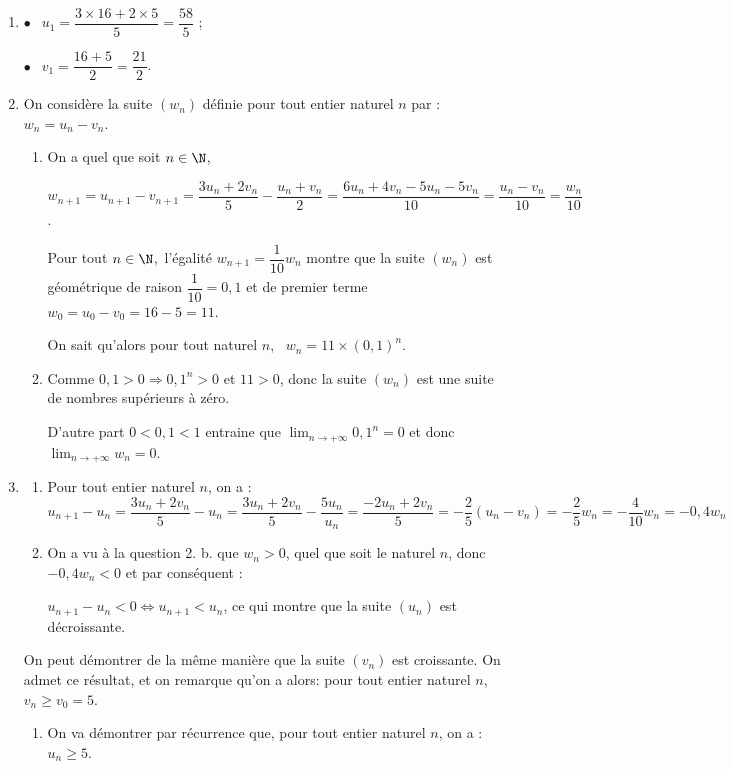 \begin{enumerate}
\item 

$\bullet~~$ $u_1 = \dfrac{3\times 16 + 2 \times 5}{5} = \dfrac{58}{5}$ ;

$\bullet~~$ $v_1 = \dfrac{16 +5}{2} = \dfrac{21}{2}$.

\item On considère la suite $\left(w_n\right)$ définie pour tout entier naturel $n$ par : $w_n = u_n - v_n$.
	\begin{enumerate}
		\item 
		On a quel que soit $n \in \N$, 
		
		$w_{n+1} = u_{n+1} - v_{n+1} = \dfrac{3u_n + 2v_n}{5} - \dfrac{u_n + v_n}{2} = \dfrac{6u_n + 4v_n - 5u_n - 5v_n}{10} = \dfrac{u_n - v_n}{10} = \dfrac{w_n}{10}$.
		
Pour tout $n \in \N$,\, l'égalité $w_{n+1} = \dfrac{1}{10}w_n$ montre que la suite $\left(w_n\right)$ est géométrique de raison $\dfrac{1}{10} = 0,1$ et de premier terme $w_0 = u_0 - v_0 = 16 - 5 = 11$.
		

On sait qu'alors pour tout naturel $n$, \, $w_n = 11 \times (0,1)^n$.
		\item 
		Comme $0,1 > 0 \Rightarrow 0,1^n > 0$ et $11 > 0$, donc la suite $\left(w_n\right)$ est une suite de nombres supérieurs à zéro.
		
		D'autre part $0 < 0,1 < 1$ entraine que $\displaystyle\lim_{n \to + \infty} 0,1^n = 0$ et donc $\displaystyle\lim_{n \to + \infty} w_n = 0$.
	\end{enumerate}
\item 
	\begin{enumerate}
		\item 
		Pour tout entier naturel $n$, on a : $u_{n+1} - u_n = \dfrac{3u_n + 2v_n}{5} - u_n =  \dfrac{3u_n + 2v_n}{5} - \dfrac{5u_n}{u_n} = \dfrac{- 2u_n + 2v_n}{5} = - \dfrac{2}{5}\left(u_n - v_n  \right) = - \dfrac{2}{5}w_n = - \dfrac{4}{10}w_n = - 0,4w_n$
		\item 
On a vu à la question 2. b. que $w_n > 0$, quel que soit le naturel $n$, donc $- 0,4w_n < 0$ et par conséquent :

$u_{n+1} - u_n < 0 \iff u_{n+1} < u_n$, ce qui montre que la suite $\left(u_n\right)$ est décroissante.
\end{enumerate}
		
On peut démontrer de la même manière que la suite $\left(v_n\right)$ est croissante. On admet ce résultat, et on remarque qu'on a alors: pour tout entier naturel $n$,\, $v_n \geqslant v_0 = 5$.
\begin{enumerate}[resume]
		\item  On va démontrer par récurrence que, pour tout entier naturel $n$, on a : $u_n \geqslant 5$. 
		

\end{enumerate}
\end{enumerate}
